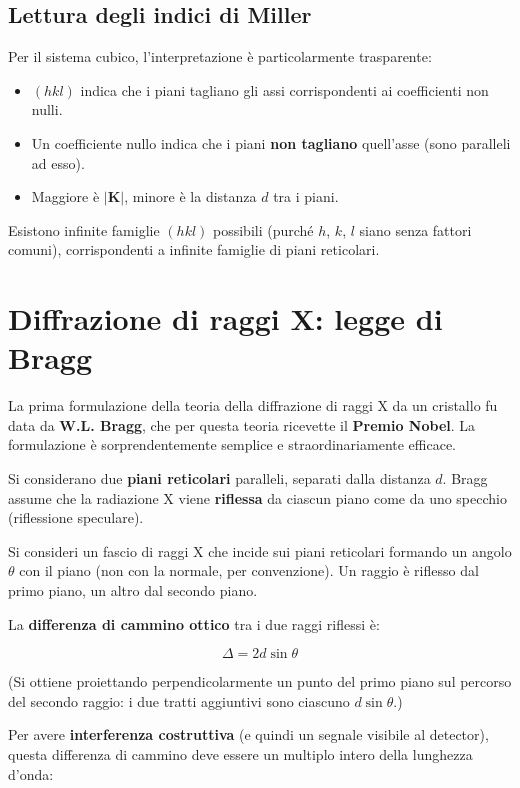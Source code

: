 \subsection*{Lettura degli indici di Miller}

Per il sistema cubico, l'interpretazione è particolarmente trasparente:

\begin{itemize}
    \item $(hkl)$ indica che i piani tagliano gli assi corrispondenti ai coefficienti non nulli.
    \item Un coefficiente nullo indica che i piani \textbf{non tagliano} quell'asse (sono paralleli ad esso).
    \item Maggiore è $|\mathbf{K}|$, minore è la distanza $d$ tra i piani.
\end{itemize}

Esistono infinite famiglie $(hkl)$ possibili (purché $h$, $k$, $l$ siano senza fattori comuni), corrispondenti a infinite famiglie di piani reticolari.

\section{Diffrazione di raggi X: legge di Bragg}

La prima formulazione della teoria della diffrazione di raggi X da un cristallo fu data da \textbf{W.L. Bragg}, che per questa teoria ricevette il \textbf{Premio Nobel}. La formulazione è sorprendentemente semplice e straordinariamente efficace.


Si considerano due \textbf{piani reticolari} paralleli, separati dalla distanza $d$. Bragg assume che la radiazione X viene \textbf{riflessa} da ciascun piano come da uno specchio (riflessione speculare).

Si consideri un fascio di raggi X che incide sui piani reticolari formando un angolo $\theta$ con il piano (non con la normale, per convenzione). Un raggio è riflesso dal primo piano, un altro dal secondo piano.

La \textbf{differenza di cammino ottico} tra i due raggi riflessi è:

$$\Delta = 2d\sin\theta$$

(Si ottiene proiettando perpendicolarmente un punto del primo piano sul percorso del secondo raggio: i due tratti aggiuntivi sono ciascuno $d\sin\theta$.)

Per avere \textbf{interferenza costruttiva} (e quindi un segnale visibile al detector), questa differenza di cammino deve essere un multiplo intero della lunghezza d'onda:


